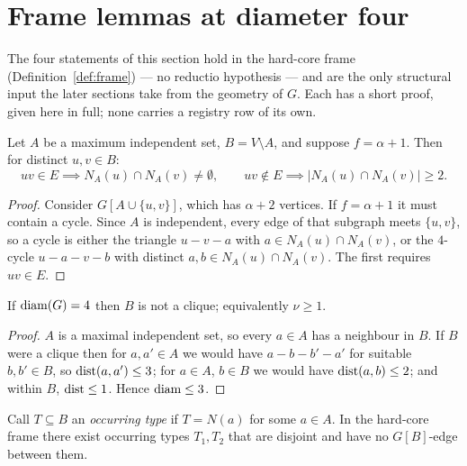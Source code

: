 \section{Frame lemmas at diameter four}\label{sec:frame}

The four statements of this section hold in the hard-core frame
(Definition~\ref{def:frame}) --- no reductio hypothesis --- and are the only structural
input the later sections take from the geometry of $G$. Each has a short proof, given here
in full; none carries a registry row of its own.

\begin{lemma}\label{lem:pair}
\Selem
Let $A$ be a maximum independent set, $B = V \setminus A$, and suppose $f = \alpha + 1$.
Then for distinct $u,v \in B$:
\[
uv \in E \implies N_A(u) \cap N_A(v) \ne \emptyset, \qquad
uv \notin E \implies |N_A(u) \cap N_A(v)| \ge 2 .
\]
\end{lemma}

\begin{proof}
Consider $G[A \cup \{u,v\}]$, which has $\alpha + 2$ vertices. If $f = \alpha+1$ it must
contain a cycle. Since $A$ is independent, every edge of that subgraph meets $\{u,v\}$, so a
cycle is either the triangle $u - v - a$ with $a \in N_A(u) \cap N_A(v)$, or the $4$-cycle
$u - a - v - b$ with distinct $a,b \in N_A(u) \cap N_A(v)$. The first requires $uv \in E$.
\end{proof}

\begin{observation}\label{obs:R1}
\Selem
If $\operatorname{diam}(G) = 4$ then $B$ is not a clique; equivalently $\nu \ge 1$.
\end{observation}

\begin{proof}
$A$ is a maximal independent set, so every $a \in A$ has a neighbour in $B$. If $B$ were a
clique then for $a, a' \in A$ we would have $a - b - b' - a'$ for suitable $b,b' \in B$, so
$\operatorname{dist}(a,a') \le 3$; for $a \in A$, $b \in B$ we would have $\operatorname{dist}(a,b) \le 2$; and within
$B$, $\operatorname{dist} \le 1$. Hence $\operatorname{diam} \le 3$.
\end{proof}

\begin{fact}\label{fact:Fb}
\Selem
Call $T \subseteq B$ an \emph{occurring type} if $T = N(a)$ for some $a \in A$. In the
hard-core frame there exist occurring types $T_1, T_2$ that are disjoint and have no
$G[B]$-edge between them.
\end{fact}

